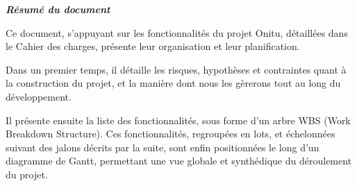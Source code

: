 \thispagestyle{empty}
\vspace*{10mm}

\textbf{\emph{\textcolor{epiBlue}{Résumé du document} } }


Ce document, s'appuyant sur les fonctionnalités du projet Onitu, détaillées dans le Cahier des charges, présente leur organisation et leur planification.

Dans un premier temps, il détaille les risques, hypothèses et contraintes quant à la construction du projet, et la manière dont nous les gèrerons tout au long du développement.

Il présente ensuite la liste des fonctionnalités, sous forme d'un arbre WBS (Work Breakdown Structure). Ces fonctionnalités, regroupées en lots, et échelonnées suivant des jalons décrits par la suite, sont enfin positionnées le long d'un diagramme de Gantt, permettant une vue globale et synthédique du déroulement du projet.

\newpage
